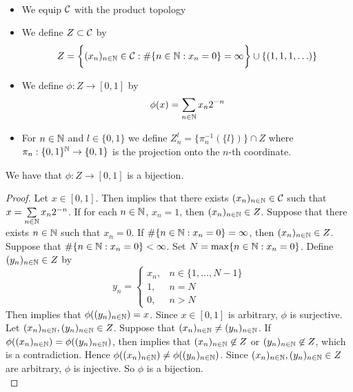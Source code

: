 \documentclass{book}
\begin{document}
	\begin{defn}  \
		\begin{itemize}
			\item We equip $\mathcal{C}$ with the product topology 
			\item We define $Z \subset \mathcal{C}$ by 
			$$Z = \bigg \{(x_n)_{n \in \mathbb{N}} \in \mathcal{C}: \# \{n \in \mathbb{N}: x_n = 0\} = \infty  \bigg \} \cup \{(1, 1, 1, \ldots)\}$$ 
			\item We define $\phi: Z \rightarrow [0,1]$ by 
			$$\phi(x) = \sum\limits_{n \in \mathbb{N}} x_n2^{-n}$$
			\item For $n \in \mathbb{N}$ and $l \in \{0,1\}$ we define $Z_n^l = \{\pi_n^{-1}(\{l\})\} \cap Z$ where $\pi_n: \{0,1 \}^{\mathbb{N}} \rightarrow \{0,1\}$ is the projection onto the $n$-th coordinate.
		\end{itemize}
	\end{defn}
	
	\begin{ex} 
		We have that $\phi:Z \rightarrow [0,1]$ is a bijection.
	\end{ex}
	
	\begin{proof}
		Let $x \in [0,1]$. Then  implies that there exists $(x_n)_{n \in \mathbb{N}} \in \mathcal{C}$ such that $x = \sum\limits_{n \in \mathbb{N}} x_n2^{-n}$. If for each $n \in \mathbb{N}$, $x_n = 1$, then $(x_n)_{n \in \mathbb{N}} \in Z$. Suppose that there exists $n \in \mathbb{N}$ such that $x_n = 0$. If $\# \{n \in \mathbb{N}: x_n = 0\} = \infty$, then $(x_n)_{n \in \mathbb{N}} \in Z$. Suppose that $ \# \{n \in \mathbb{N}: x_n = 0\} < \infty$. Set $N = \max \{ n \in \mathbb{N}: x_n = 0\}$. Define $(y_n)_{n \in \mathbb{N}} \in Z$ by 
		\[
		y_n = 
		\begin{cases}
			x_n, & n \in \{1, \ldots, N-1\} \\
			1, & n = N \\
			0, & n > N
		\end{cases}
		\]
		Then  implies that $\phi((y_n)_{n \in \mathbb{N}}) = x$. Since $x \in [0,1]$ is arbitrary, $\phi$ is surjective. \vspace{.2cm}\\  Let $(x_n)_{n \in \mathbb{N}}, (y_n)_{n \in \mathbb{N}} \in Z$. Suppose that $(x_n)_{n \in \mathbb{N}} \neq (y_n)_{n \in \mathbb{N}}$. If  $\phi((x_n)_{n \in \mathbb{N}}) = \phi((y_n)_{n \in \mathbb{N}})$, then  implies that $(x_n)_{n \in \mathbb{N}} \not \in Z$ or $(y_n)_{n \in \mathbb{N}} \not \in Z$, which is a contradiction. Hence $\phi((x_n)_{n \in \mathbb{N}}) \neq \phi((y_n)_{n \in \mathbb{N}})$. Since $(x_n)_{n \in \mathbb{N}}, (y_n)_{n \in \mathbb{N}} \in Z$ are arbitrary, $\phi$ is injective. So $\phi$ is a bijection. \\
	\end{proof}
	
\end{document}
